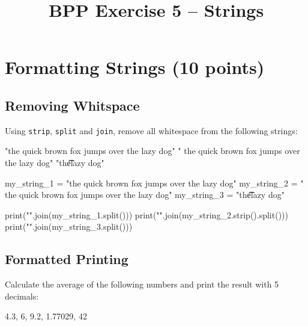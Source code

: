 


\title{BPP Exercise 5 -- Strings}




\section{Formatting Strings (10 points)}

\subsection{Removing Whitspace}

Using \texttt{strip}, \texttt{split} and \texttt{join}, remove all whitespace from the following strings:

\begin{outputcode}

"the quick brown fox jumps over the lazy dog"
"   the quick \n brown fox jumps over the lazy dog"
"the\t\t\tquickbrownfoxjumpsoverthe lazy dog"

\end{outputcode}

\vspace{1em}

\begin{solution}

    \begin{pythoncode}

my_string_1 = "the quick brown fox jumps over the lazy dog"
my_string_2 = "   the quick \n brown fox jumps over the lazy dog"
my_string_3 = "the\t\t\tquickbrownfoxjumpsoverthe lazy dog"

print("".join(my_string_1.split()))
print("".join(my_string_2.strip().split()))
print("".join(my_string_3.split()))

    \end{pythoncode}

\end{solution}


\subsection{Formatted Printing}

Calculate the average of the following numbers and print the result with 5 decimals:

\begin{outputcode}

4.3, 6, 9.2, 1.77029, 42

\end{outputcode}

